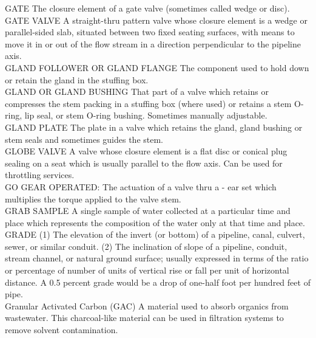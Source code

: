 GATE
The closure element of a gate valve (sometimes called wedge or disc).
\vspace{0.3cm}\\
GATE VALVE
A straight-thru pattern valve whose closure element is a wedge or parallel-sided slab, situated between two fixed seating surfaces, with means to move it in or out of the flow stream in a direction perpendicular to the pipeline axis.
\vspace{0.3cm}\\
GLAND FOLLOWER OR GLAND FLANGE
The component used to hold down or retain the gland in the stuffing box.
\vspace{0.3cm}\\
GLAND OR GLAND BUSHING
That part of a valve which retains or compresses the stem packing in a stuffing box (where used) or retains a stem O-ring, lip seal, or stem O-ring bushing. Sometimes manually adjustable.
\vspace{0.3cm}\\
GLAND PLATE
The plate in a valve which retains the gland, gland bushing or stem seals and sometimes guides the stem.
\vspace{0.3cm}\\
GLOBE VALVE
A valve whose closure element is a flat disc or conical plug sealing on a seat which is usually parallel to the flow axis. Can be used for throttling services.
\vspace{0.3cm}\\
GO
GEAR OPERATED:  The actuation of a valve thru a - ear set which multiplies the torque applied to the valve stem.
\vspace{0.3cm}\\
GRAB SAMPLE
A single sample of water collected at a particular time and place which represents the composition of the water only at that time and place.
\vspace{0.3cm}\\
GRADE
(1) The elevation of the invert (or bottom) of a pipeline, canal, culvert, sewer, or similar conduit. (2) The inclination of slope of a pipeline, conduit, stream channel, or natural ground surface; usually expressed in terms of the ratio or percentage of number of units of vertical rise or fall per unit of horizontal distance. A 0.5 percent grade would be a drop of one-half foot per hundred feet of pipe. 
\vspace{0.3cm}\\
Granular Activated Carbon (GAC)
A material used to absorb organics from wastewater. This charcoal-like material can be used in filtration systems to remove solvent contamination.
